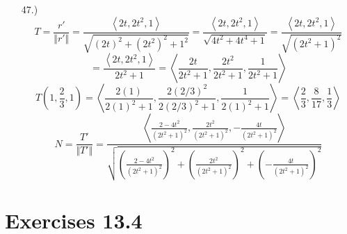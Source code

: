 \documentclass[12pt]{article}
\newcommand{\angleb}[1]{\left\langle#1\right\rangle}
\newcommand{\parns}[1]{\left(#1\right)}
\begin{document}
\begin{itemize}
    \item [47.)] \[T=\frac{r'}{\Vert r'\Vert}=\frac{\angleb{2t,2t^2,1}}{\sqrt{(2t)^2+(2t^2)^2+1^2}}=\frac{\angleb{2t,2t^2,1}}{\sqrt{4t^2+4t^4+1}}=\frac{\angleb{2t,2t^2,1}}{\sqrt{(2t^2+1)^2}}\]
    \[=\frac{\angleb{2t,2t^2,1}}{2t^2+1}=\angleb{\frac{2t}{2t^2+1},\frac{2t^2}{2t^2+1},\frac{1}{2t^2+1}}\]
    \[T\parns{1,\frac{2}{3},1}=\angleb{\frac{2(1)}{2(1)^2+1},\frac{2(2/3)^2}{2(2/3)^2+1},\frac{1}{2(1)^2+1}}=\angleb{\frac{2}{3},\frac{8}{17},\frac{1}{3}}\]
    \[N=\frac{T'}{\Vert T'\Vert}=\frac{\angleb{\frac{2-4t^2}{(2t^2+1)^2},\frac{2t^2}{(2t^2+1)^2},-\frac{4t}{(2t^2+1)^2}}}{\sqrt{\parns{\frac{2-4t^2}{(2t^2+1)^2}}^2+\parns{\frac{2t^2}{(2t^2+1)^2}}^2+\parns{-\frac{4t}{(2t^2+1)^2}}^2}}\]

\end{itemize}
\section*{Exercises 13.4}
\end{document}
